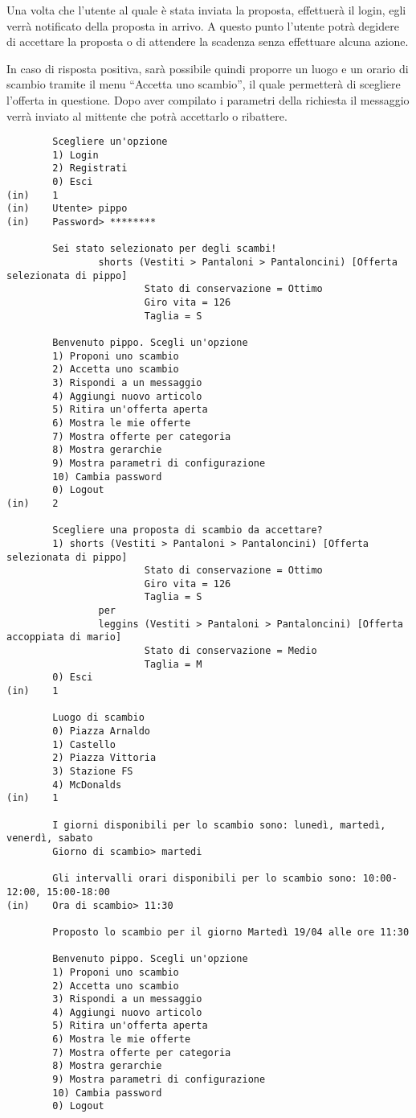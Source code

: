Una volta che l'utente al quale è stata inviata la proposta, effettuerà il login, egli verrà notificato della proposta in arrivo. A questo punto l'utente potrà degidere di accettare la proposta o di attendere la scadenza senza effettuare alcuna azione.

In caso di risposta positiva, sarà possibile quindi proporre un luogo e un orario di scambio tramite il menu ``Accetta uno scambio'', il quale permetterà di scegliere l'offerta in questione. Dopo aver compilato i parametri della richiesta il messaggio verrà inviato al mittente che potrà accettarlo o ribattere.

\begin{lstlisting}
        Scegliere un'opzione
        1) Login
        2) Registrati
        0) Esci
(in)    1
(in)    Utente> pippo
(in)    Password> ********

        Sei stato selezionato per degli scambi!
                shorts (Vestiti > Pantaloni > Pantaloncini) [Offerta selezionata di pippo]
                        Stato di conservazione = Ottimo
                        Giro vita = 126
                        Taglia = S

        Benvenuto pippo. Scegli un'opzione
        1) Proponi uno scambio
        2) Accetta uno scambio
        3) Rispondi a un messaggio
        4) Aggiungi nuovo articolo
        5) Ritira un'offerta aperta
        6) Mostra le mie offerte
        7) Mostra offerte per categoria
        8) Mostra gerarchie
        9) Mostra parametri di configurazione
        10) Cambia password
        0) Logout
(in)    2

        Scegliere una proposta di scambio da accettare?
        1) shorts (Vestiti > Pantaloni > Pantaloncini) [Offerta selezionata di pippo]
                        Stato di conservazione = Ottimo
                        Giro vita = 126
                        Taglia = S
                per
                leggins (Vestiti > Pantaloni > Pantaloncini) [Offerta accoppiata di mario]
                        Stato di conservazione = Medio
                        Taglia = M
        0) Esci
(in)    1

        Luogo di scambio
        0) Piazza Arnaldo
        1) Castello
        2) Piazza Vittoria
        3) Stazione FS
        4) McDonalds
(in)    1

        I giorni disponibili per lo scambio sono: lunedì, martedì, venerdì, sabato
        Giorno di scambio> martedi

        Gli intervalli orari disponibili per lo scambio sono: 10:00-12:00, 15:00-18:00
(in)    Ora di scambio> 11:30

        Proposto lo scambio per il giorno Martedì 19/04 alle ore 11:30

        Benvenuto pippo. Scegli un'opzione
        1) Proponi uno scambio
        2) Accetta uno scambio
        3) Rispondi a un messaggio
        4) Aggiungi nuovo articolo
        5) Ritira un'offerta aperta
        6) Mostra le mie offerte
        7) Mostra offerte per categoria
        8) Mostra gerarchie
        9) Mostra parametri di configurazione
        10) Cambia password
        0) Logout
\end{lstlisting}

